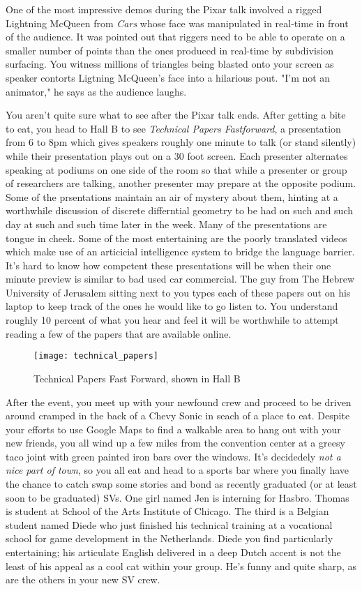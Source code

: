 \documentclass[../main.tex]{subfiles}
\begin{document}
One of the most impressive demos during the Pixar talk involved a rigged Lightning McQueen from \textit{Cars} whose face was manipulated in real-time in front of the audience. It was pointed out that riggers need to be able to operate on a smaller number of points than the ones produced in real-time by subdivision surfacing. You witness millions of triangles being blasted onto your screen as speaker  contorts Ligtning McQueen's face into a hilarious pout. "I'm not an animator," he says as the audience laughs.

You aren't quite sure what to see after the Pixar talk ends. After getting a bite to eat, you head to Hall B to see \textit{Technical Papers Fastforward}, a presentation from 6 to 8pm which gives speakers roughly one minute to talk (or stand silently) while their presentation plays out on a 30 foot screen. Each presenter alternates speaking at podiums on one side of the room so that while a presenter or group of researchers are talking, another presenter may prepare at the opposite podium. Some of the prsentations maintain an air of mystery about them, hinting at a worthwhile discussion of discrete differntial geometry to be had on such and such day at such and such time later in the week. Many of the presentations are tongue in cheek. Some of the most entertaining are the poorly translated videos which make use of an articicial intelligence system to bridge the language barrier. It's hard to know how competent these presentations will be when their one minute preview is similar to bad used car commercial. The guy from The Hebrew University of Jerusalem sitting next to you types each of these papers out on his laptop to keep track of the ones he would like to go listen to. You understand roughly 10 percent of what you hear and feel it will be worthwhile to attempt reading a few of the papers that are available online.

\begin{figure}[h!]
	\centering
	\texttt{[image: technical\_papers]}
	\caption*{Technical Papers Fast Forward, shown in Hall B}
\end{figure}

After the event, you meet up with your newfound crew and proceed to be driven around cramped in the back of a Chevy Sonic in seach of a place to eat. Despite your efforts to use Google Maps to find a walkable area to hang out with your new friends, you all wind up a few miles from the convention center at a greesy taco joint with green painted iron bars over the windows. It's decidedely \textit{not a nice part of town}, so you all eat and head to a sports bar where you finally have the chance to catch swap some stories and bond as recently graduated (or at least soon to be graduated) SVs. One girl named Jen is interning for Hasbro. Thomas is student at School of the Arts Institute of Chicago. The third is a Belgian student named Diede who just finished his technical training at a vocational school for game development in the Netherlands. Diede you find particularly entertaining; his articulate English delivered in a deep Dutch accent is not the least of his appeal as a cool cat within your group. He's funny and quite sharp, as are the others in your new SV crew. 
\end{document}
